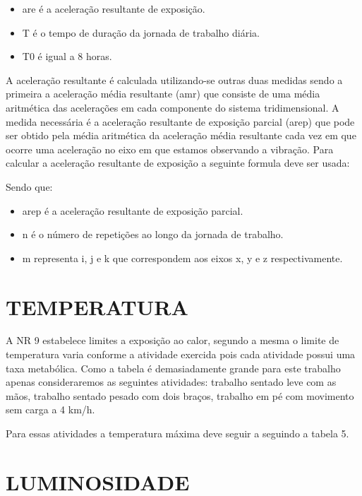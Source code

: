 \begin{itemize}
    \item are é a aceleração resultante de exposição.
    \item T é o tempo de duração da jornada de trabalho diária.
    \item 	T0 é igual a 8 horas.
\end{itemize}

A aceleração resultante é calculada utilizando-se outras duas medidas sendo a primeira a aceleração média resultante (amr) que consiste de uma média aritmética das acelerações em cada componente do sistema tridimensional. A medida necessária é a aceleração resultante de exposição parcial (arep) que pode ser obtido pela média aritmética da aceleração média resultante cada vez em que ocorre uma aceleração no eixo em que estamos observando a vibração.
Para calcular a aceleração resultante de exposição a seguinte formula deve ser usada:

Sendo que:

\begin{itemize}
    \item arep é a aceleração resultante de exposição parcial.
    \item n é o número de repetições ao longo da jornada de trabalho.
    \item m representa i, j e k que correspondem aos eixos x, y e z respectivamente.
\end{itemize}

\section{TEMPERATURA}
\label{subsec: temperatura}

A NR 9 estabelece limites a exposição ao calor, segundo a mesma o limite de temperatura varia conforme a atividade exercida pois cada atividade possui uma taxa metabólica. Como a tabela é demasiadamente grande para este trabalho apenas consideraremos as seguintes atividades: trabalho sentado leve com as mãos, trabalho sentado pesado com dois braços, trabalho em pé com movimento sem carga a 4 km/h.

Para essas atividades a temperatura máxima deve seguir a seguindo a tabela 5.

\section{LUMINOSIDADE}
\label{subsec: luminosidade}

